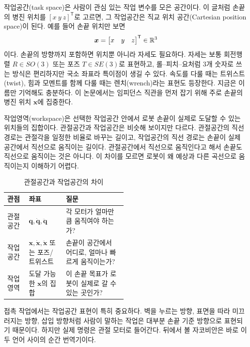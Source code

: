 작업공간(task space)은 사람이 관심 있는 작업 변수를 모은 공간이다.
이 글처럼 손끝의 병진 위치를 \([x\ y\ z]^{\mathsf{T}}\)로 고르면, 그 작업공간은 직교 위치 공간(Cartesian position space)이 된다.
예를 들어 손끝 위치만 보면
\begin{equation}
  \bm{x}
  =
  \begin{bmatrix}
    x & y & z
  \end{bmatrix}^{\mathsf{T}}
  \in \mathbb{R}^3
\end{equation}
이다.
손끝의 방향까지 포함하면 위치뿐 아니라 자세도 필요하다.
자세는 보통 회전행렬 \(R\in SO(3)\) 또는 포즈 \(T\in SE(3)\)로 표현하고, 롤--피치--요처럼 3개 숫자로 쓰는 방식은 편리하지만 국소 좌표라 특이점이 생길 수 있다.
속도를 다룰 때는 트위스트(twist), 힘과 모멘트를 함께 다룰 때는 렌치(wrench)라는 표현도 등장한다.
지금은 이름만 기억해도 충분하다.
이 논문에서는 임피던스 직관을 먼저 잡기 위해 주로 손끝의 병진 위치 \(\bm{x}\)에 집중한다.

작업영역(workspace)은 선택한 작업공간 안에서 로봇 손끝이 실제로 도달할 수 있는 위치들의 집합이다.
관절공간과 작업공간은 비슷해 보이지만 다르다.
관절공간의 직선 경로는 관절각을 일정한 비율로 바꾸는 길이고, 작업공간의 직선 경로는 손끝이 실제 공간에서 직선으로 움직이는 길이다.
관절공간에서 직선으로 움직인다고 해서 손끝도 직선으로 움직이는 것은 아니다.
이 차이를 모르면 로봇이 왜 예상과 다른 곡선으로 움직이는지 이해하기 어렵다.

\begin{table}[!htbp]
  \centering
  \caption{관절공간과 작업공간의 차이}
  \label{tab:joint-task-space}
  \small
  \renewcommand{\arraystretch}{1.12}
  \begin{tabularx}{\linewidth}{@{}p{0.18\linewidth}p{0.31\linewidth}X@{}}
    \toprule
    관점 & 좌표 & 질문 \\
    \midrule
    관절공간 & \(\bm{q},\dot{\bm{q}},\ddot{\bm{q}}\) & 각 모터가 얼마만큼 움직여야 하는가? \\
    작업공간 & \(\bm{x},\dot{\bm{x}},\ddot{\bm{x}}\) 또는 포즈/트위스트 & 손끝이 공간에서 어디로, 얼마나 빠르게 움직이는가? \\
    작업영역 & 도달 가능한 \(\bm{x}\)의 집합 & 이 손끝 목표가 로봇이 실제로 갈 수 있는 곳인가? \\
    \bottomrule
  \end{tabularx}
\end{table}

접촉 작업에서는 작업공간 표현이 특히 중요하다.
벽을 누르는 방향, 표면을 따라 미끄러지는 방향, 삽입 방향처럼 사람이 말하는 작업은 대부분 손끝 기준 방향으로 표현되기 때문이다.
하지만 실제 명령은 관절 모터로 들어간다.
뒤에서 볼 자코비안은 바로 이 두 언어 사이의 순간 번역기이다.

